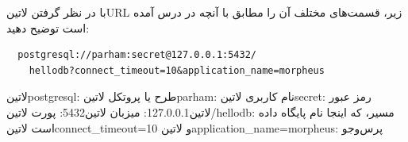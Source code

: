 
با در نظر گرفتن ‌لاتین{URL} زیر، قسمت‌های مختلف آن را مطابق با آنچه در درس آمده است توضیح دهید:

\begin{latin}
\begin{verbatim}
  postgresql://parham:secret@127.0.0.1:5432/
    hellodb?connect_timeout=10&application_name=morpheus
\end{verbatim}
\end{latin}


\begin{پاسخ}

 ‌لاتین{postgresql}: طرح یا پروتکل
 ‌لاتین{parham}: نام کاربری
 ‌لاتین{secret}: رمز عبور
 ‌لاتین{127.0.0.1}: میزبان
 ‌لاتین{5432}: پورت
 ‌لاتین{/hellodb}: مسیر، که اینجا نام پایگاه داده است
 ‌لاتین{connect\_timeout=10} و ‌لاتین{application\_name=morpheus}: پرس‌وجو

\end{پاسخ}
